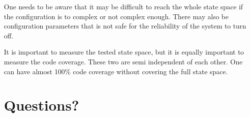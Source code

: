 \documentclass[a4paper]{article}
\begin{document}
One needs to be aware that it may be difficult to reach the whole
state space if the configuration is to complex or not complex
enough. There may also be configuration parameters that is not safe
for the reliability of the system to turn off.

It is important to measure the tested state space, but it is equally
important to measure the code coverage. These two are semi independent
of each other. One can have almost 100\% code coverage without covering
the full state space.

\section{Questions?}
\end{document}
